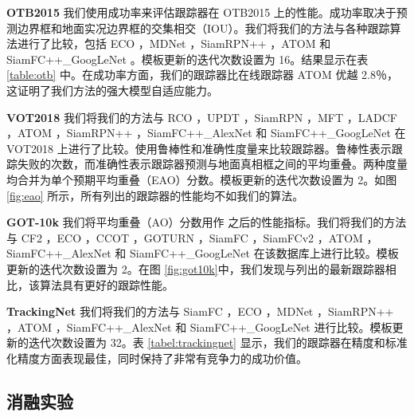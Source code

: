 \textbf{OTB2015} 我们使用成功率来评估跟踪器在 OTB2015 上的性能。成功率取决于预测边界框和地面实况边界框的交集相交（IOU）。我们将我们的方法与各种跟踪算法进行了比较，包括 ECO \cite{danelljan2017eco}，MDNet \cite{nam2016learning}，SiamRPN++ \cite{SiamRPN++}，ATOM \cite{danelljan2019atom} 和 SiamFC++\_GoogLeNet \cite{SiamFC++}。模板更新的迭代次数设置为 16。结果显示在表 \ref{table:otb} 中。在成功率方面，我们的跟踪器比在线跟踪器 ATOM 优越 2.8％，这证明了我们方法的强大模型自适应能力。

\textbf{VOT2018} 我们将我们的方法与 RCO \cite{kristan2018sixth}，UPDT \cite{bhat2018unveiling}，SiamRPN \cite{SiamRPN}，MFT \cite{kristan2018sixth}，LADCF \cite{kristan2018sixth}，ATOM \cite{danelljan2019atom}，SiamRPN++ \cite{SiamRPN++}，SiamFC++\_AlexNet \cite{SiamFC++} 和 SiamFC++\_GoogLeNet \cite{SiamFC++} 在 VOT2018 上进行了比较。使用鲁棒性和准确性度量来比较跟踪器。鲁棒性表示跟踪失败的次数，而准确性表示跟踪器预测与地面真相框之间的平均重叠。两种度量均合并为单个预期平均重叠（EAO）分数。模板更新的迭代次数设置为 2。如图 \ref{fig:eao} 所示，所有列出的跟踪器的性能均不如我们的算法。

\textbf{GOT-10k} 我们将平均重叠（AO）分数用作 \cite{GOT-10k}之后的性能指标。我们将我们的方法与 CF2 \cite{CF2}，ECO \cite{danelljan2017eco}，CCOT \cite{CCOT}，GOTURN \cite{GOTURN}，SiamFC \cite{SiamFC}，SiamFCv2 \cite{valmadre2017end}，ATOM \cite{danelljan2019atom}，SiamFC++\_AlexNet \cite{SiamFC++} 和 SiamFC++\_GoogLeNet \cite{SiamFC++} 在该数据库上进行比较。模板更新的迭代次数设置为 2。在图 \ref{fig:got10k}中，我们发现与列出的最新跟踪器相比，该算法具有更好的跟踪性能。

\textbf{TrackingNet} 我们将我们的方法与 SiamFC \cite{SiamFC}，ECO \cite{danelljan2017eco}，MDNet \cite{nam2016learning}，SiamRPN++ \cite{SiamRPN++}，ATOM \cite{danelljan2019atom}，SiamFC++\_AlexNet \cite{SiamFC++} 和 SiamFC++\_GoogLeNet \cite{SiamFC++} 进行比较。模板更新的迭代次数设置为 32。表 \ref{tabel:trackingnet} 显示，我们的跟踪器在精度和标准化精度方面表现最佳，同时保持了非常有竞争力的成功价值。

\subsection{消融实验}

